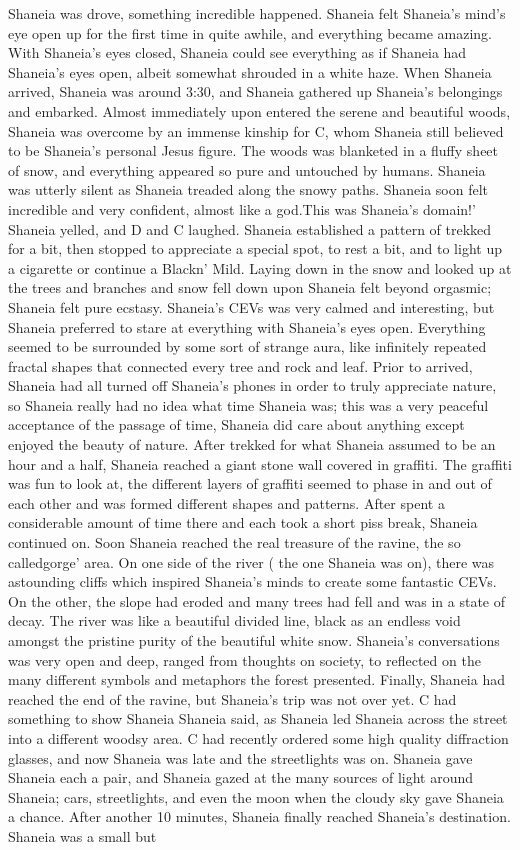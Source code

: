\documentclass[12pt]{book}
\begin{document}
Shaneia was drove, something incredible happened. Shaneia felt Shaneia's mind's eye open up for the first time in quite awhile, and everything became amazing. With Shaneia's eyes closed, Shaneia could see everything as if Shaneia had Shaneia's eyes open, albeit somewhat shrouded in a white haze. When Shaneia arrived, Shaneia was around 3:30, and Shaneia gathered up Shaneia's belongings and embarked. Almost immediately upon entered the serene and beautiful woods, Shaneia was overcome by an immense kinship for C, whom Shaneia still believed to be Shaneia's personal Jesus figure. The woods was blanketed in a fluffy sheet of snow, and everything appeared so pure and untouched by humans. Shaneia was utterly silent as Shaneia treaded along the snowy paths. Shaneia soon felt incredible and very confident, almost like a god.This was Shaneia's domain!' Shaneia yelled, and D and C laughed. Shaneia established a pattern of trekked for a bit, then stopped to appreciate a special spot, to rest a bit, and to light up a cigarette or continue a Blackn' Mild. Laying down in the snow and looked up at the trees and branches and snow fell down upon Shaneia felt beyond orgasmic; Shaneia felt pure ecstasy. Shaneia's CEVs was very calmed and interesting, but Shaneia preferred to stare at everything with Shaneia's eyes open. Everything seemed to be surrounded by some sort of strange aura, like infinitely repeated fractal shapes that connected every tree and rock and leaf. Prior to arrived, Shaneia had all turned off Shaneia's phones in order to truly appreciate nature, so Shaneia really had no idea what time Shaneia was; this was a very peaceful acceptance of the passage of time, Shaneia did care about anything except enjoyed the beauty of nature. After trekked for what Shaneia assumed to be an hour and a half, Shaneia reached a giant stone wall covered in graffiti. The graffiti was fun to look at, the different layers of graffiti seemed to phase in and out of each other and was formed different shapes and patterns. After spent a considerable amount of time there and each took a short piss break, Shaneia continued on. Soon Shaneia reached the real treasure of the ravine, the so calledgorge' area. On one side of the river ( the one Shaneia was on), there was astounding cliffs which inspired Shaneia's minds to create some fantastic CEVs. On the other, the slope had eroded and many trees had fell and was in a state of decay. The river was like a beautiful divided line, black as an endless void amongst the pristine purity of the beautiful white snow. Shaneia's conversations was very open and deep, ranged from thoughts on society, to reflected on the many different symbols and metaphors the forest presented. Finally, Shaneia had reached the end of the ravine, but Shaneia's trip was not over yet. C had something to show Shaneia Shaneia said, as Shaneia led Shaneia across the street into a different woodsy area. C had recently ordered some high quality diffraction glasses, and now Shaneia was late and the streetlights was on. Shaneia gave Shaneia each a pair, and Shaneia gazed at the many sources of light around Shaneia; cars, streetlights, and even the moon when the cloudy sky gave Shaneia a chance. After another 10 minutes, Shaneia finally reached Shaneia's destination. Shaneia was a small but 
\end{document}
